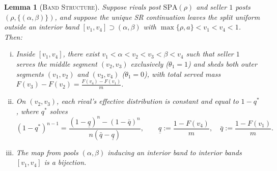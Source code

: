 \documentclass[12pt]{article}
\theoremstyle{mystyle}
\newtheorem{lemma}{Lemma}
\theoremstyle{mystyle2}
\newcommand{\SPA}{\mathrm{SPA}}
\newcommand{\1}{\mathbf{1}}
\begin{document}
\begin{lemma}[\textsc{Band Structure}]\label{lem:genband}
Suppose rivals post $\SPA(\rho)$ and seller $1$ posts $(\rho,\{(\alpha,\beta)\})$, and suppose the unique SR continuation leaves the split uniform outside an interior band $[v_1,v_4]\supset(\alpha,\beta)$ with $\max\{\rho,a\}<v_1<v_4<1$. Then:
\begin{enumerate}[(i)]
\item Inside $[v_1,v_4]$, there exist $v_1<\alpha<v_2<v_3<\beta<v_4$ such that seller $1$ serves the middle segment $(v_2,v_3)$ exclusively ($\theta_1=1$) and sheds both outer segments $(v_1,v_2)$ and $(v_3,v_4)$ ($\theta_1=0$), with total served mass $F(v_3)-F(v_2)=\frac{F(v_4)-F(v_1)}{m}$.
\item On $(v_2,v_3)$, each rival's effective distribution is constant and equal to $1-q^*$, where $q^*$ solves
\begin{equation}\label{eq:qstar}
(1 - q^*)^{n-1} = \frac{(1 - \underline q)^n - (1 - \bar q)^n}{n(\bar q - \underline q)}, \qquad \underline q := \frac{1-F(v_4)}{m},\quad \bar q := \frac{1-F(v_1)}{m}.
\end{equation}
\item The map from pools $(\alpha,\beta)$ inducing an interior band to interior bands $[v_1,v_4]$ is a bijection.
\end{enumerate}
\end{lemma}
\end{document}
